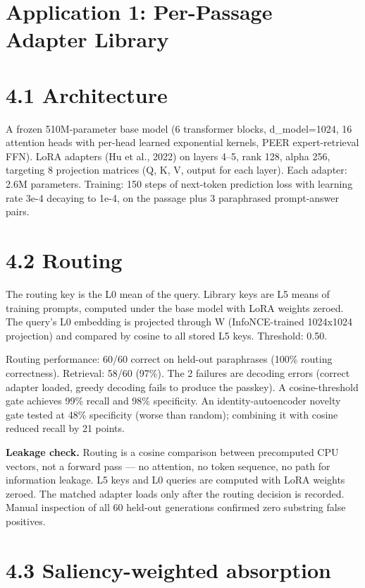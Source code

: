 \section{Application 1: Per-Passage Adapter Library}\label{application-1-per-passage-adapter-library}

\section{4.1 Architecture}\label{architecture}

A frozen 510M-parameter base model (6 transformer blocks, d\_model=1024, 16 attention heads with per-head learned exponential kernels, PEER expert-retrieval FFN). LoRA adapters (Hu et al., 2022) on layers 4--5, rank 128, alpha 256, targeting 8 projection matrices (Q, K, V, output for each layer). Each adapter: 2.6M parameters. Training: 150 steps of next-token prediction loss with learning rate 3e-4 decaying to 1e-4, on the passage plus 3 paraphrased prompt-answer pairs.

\section{4.2 Routing}\label{routing}

The routing key is the L0 mean of the query. Library keys are L5 means of training prompts, computed under the base model with LoRA weights zeroed. The query's L0 embedding is projected through W (InfoNCE-trained 1024x1024 projection) and compared by cosine to all stored L5 keys. Threshold: 0.50.

Routing performance: 60/60 correct on held-out paraphrases (100\% routing correctness). Retrieval: 58/60 (97\%). The 2 failures are decoding errors (correct adapter loaded, greedy decoding fails to produce the passkey). A cosine-threshold gate achieves 99\% recall and 98\% specificity. An identity-autoencoder novelty gate tested at 48\% specificity (worse than random); combining it with cosine reduced recall by 21 points.

\textbf{Leakage check.} Routing is a cosine comparison between precomputed CPU vectors, not a forward pass --- no attention, no token sequence, no path for information leakage. L5 keys and L0 queries are computed with LoRA weights zeroed. The matched adapter loads only after the routing decision is recorded. Manual inspection of all 60 held-out generations confirmed zero substring false positives.

\section{4.3 Saliency-weighted absorption}\label{saliency-weighted-absorption}

